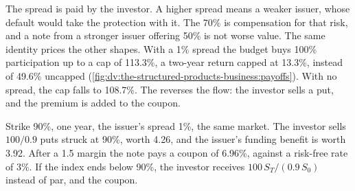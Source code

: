 The spread is paid by the investor. A higher spread means a weaker issuer, whose default would take the protection with it. The
70\% is compensation for that risk, and a note from a stronger issuer offering 50\% is not worse value. The same identity prices
the other shapes. With a 1\% spread the budget buys 100\% participation up to a cap of 113.3\%, a two-year return capped at 13.3\%,
instead of 49.6\% uncapped (\cref{fig:dv:the-structured-products-business:payoffs}). With no spread, the cap falls to 108.7\%. The
 reverses the flow: the investor sells a put, and the premium is added to the coupon.

\begin{example}\label{ex:dv:the-structured-products-business:rc}
Strike 90\%, one year, the issuer's spread 1\%, the same market. The investor sells $100/0.9$ puts struck at 90\%, worth 4.26, and the
issuer's funding benefit is worth 3.92. After a 1.5 margin the note pays a coupon of 6.96\%, against a risk-free rate of 3\%. If the
index ends below 90\%, the investor receives $100\,S_T/(0.9\,S_0)$ instead of par, and the coupon.
\end{example}

\begin{omfigure}

\label{fig:dv:the-structured-products-business:payoffs}
\end{omfigure}

